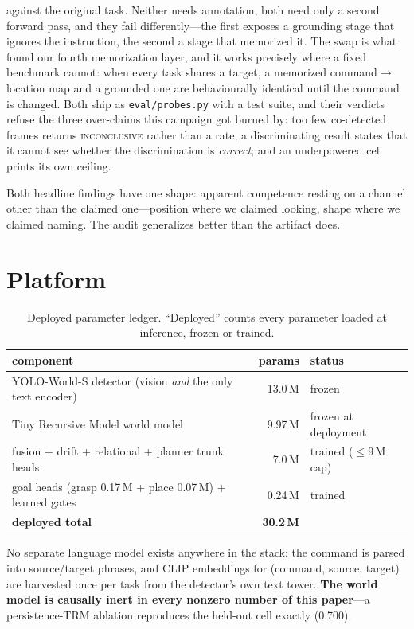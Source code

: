 \documentclass[10pt,twocolumn,letterpaper]{article}
\begin{document}
\begin{enumerate}
{against the original task}. Neither needs annotation, both need only a second
forward pass, and they fail differently---the first exposes a grounding stage
that ignores the instruction, the second a stage that memorized it. The swap is
what found our fourth memorization layer, and it works precisely where a fixed
benchmark cannot: when every task shares a target, a memorized
command$\to$location map and a grounded one are behaviourally identical until
the command is changed. Both ship as \texttt{eval/probes.py} with a test suite,
and their verdicts refuse the three over-claims this campaign got burned by:
too few co-detected frames returns \textsc{inconclusive} rather than a rate; a
discriminating result states that it cannot see whether the discrimination is
\emph{correct}; and an underpowered cell prints its own ceiling.
\end{enumerate}

\noindent Both headline findings have one shape: apparent competence resting on
a channel other than the claimed one---position where we claimed looking, shape
where we claimed naming. The audit generalizes better than the artifact does.

\section{Platform}

\begin{table}[h]\centering\small
\caption{Deployed parameter ledger. ``Deployed'' counts every parameter loaded
at inference, frozen or trained.}
\begin{tabular}{lrl}
\toprule
component & params & status \\
\midrule
YOLO-World-S detector (vision \emph{and} the only text encoder) & 13.0\,M & frozen \\
Tiny Recursive Model world model & 9.97\,M & frozen at deployment \\
fusion + drift + relational + planner trunk heads & 7.0\,M & trained ($\le$9\,M cap) \\
goal heads (grasp 0.17\,M + place 0.07\,M) + learned gates & 0.24\,M & trained \\
\midrule
\textbf{deployed total} & \textbf{30.2\,M} & \\
\bottomrule
\end{tabular}
\end{table}

No separate language model exists anywhere in the stack: the command is parsed
into source/target phrases, and CLIP embeddings for (command, source, target)
are harvested once per task from the detector's own text tower. \textbf{The
world model is causally inert in every nonzero number of this paper}---a
persistence-TRM ablation reproduces the held-out cell exactly (0.700).
\end{document}
